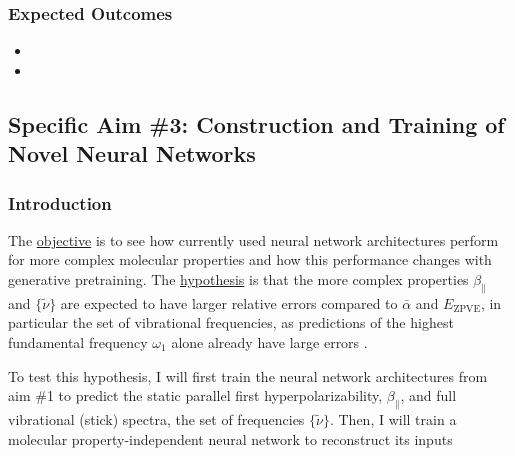 \documentclass[12pt]{article}
\begin{document}

\subsubsection{Expected Outcomes}
\label{sec:org231dc8e}

\begin{itemize}
\item {}
\item {}
\end{itemize}

\subsection{Specific Aim \#3: Construction and Training of Novel Neural Networks}
\label{sec:orgadd8aeb}

\subsubsection{Introduction}
\label{sec:org77bc304}

The \uline{objective} is to see how currently used neural network architectures perform for more complex molecular properties and how this performance changes with generative pretraining. The \uline{hypothesis} is that the more complex properties \(\beta_{\parallel}\) and \(\{\tilde{\nu}\}\) are expected to have larger relative errors compared to \(\bar{\alpha}\) and \(E_{\text{ZPVE}}\), in particular the set of vibrational frequencies, as predictions of the highest fundamental frequency \(\omega_1\) alone already have large errors \cite{2017arXiv170205532F}.


To test this hypothesis, I will first train the neural network architectures from aim \#1 to predict the static parallel first hyperpolarizability, \(\beta_{\parallel}\), and full vibrational (stick) spectra, the set of frequencies \(\{\tilde{\nu}\}\). Then, I will train a molecular property-independent neural network to reconstruct its inputs
\end{document}
